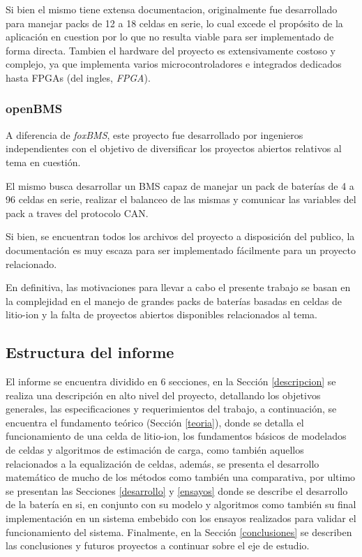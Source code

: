 \documentclass[10pt, a4paper]{article}
\begin{document}
\noindent Si bien el mismo tiene extensa documentacion, originalmente fue
desarrollado para manejar packs de 12 a 18 celdas en serie, lo cual excede el
prop\'osito de la aplicaci\'on en cuestion por lo que no resulta viable para ser
implementado de forma directa. Tambien el hardware del proyecto es
extensivamente costoso y complejo, ya que implementa varios microcontroladores e
integrados dedicados hasta \acrshort{FPGA}s (del ingles, \emph{\acrlong{FPGA}}).

\subsubsection{openBMS}

A diferencia de \emph{foxBMS}, este proyecto fue desarrollado por ingenieros
independientes con el objetivo de diversificar los proyectos abiertos relativos
al tema en cuesti\'on.

\noindent El mismo busca desarrollar un \acrshort{BMS} capaz de manejar un
pack de bater\'ias de 4 a 96 celdas en serie, realizar el balanceo de las mismas 
y comunicar las variables del pack a traves del protocolo \acrshort{CAN}.

\noindent Si bien, se encuentran todos los archivos del proyecto a disposición
del publico, la documentaci\'on es muy escaza para ser implementado
f\'acilmente para un proyecto relacionado.

\noindent En definitiva, las motivaciones para llevar a cabo el presente trabajo
se basan en la complejidad en el manejo de grandes packs de
bater\'ias basadas en celdas de litio-ion y la falta de proyectos abiertos
disponibles relacionados al tema.

\subsection{Estructura del informe}

El informe se encuentra dividido en 6 secciones, en la Sección \ref{descripcion}
se realiza una descripci\'on en alto nivel del proyecto, detallando los
objetivos generales, las especificaciones y requerimientos del trabajo, a
continuaci\'on, se encuentra el fundamento te\'orico (Secci\'on \ref{teoria}),
donde se detalla el funcionamiento de una celda de litio-ion, los fundamentos
b\'asicos de modelados de celdas y algoritmos de estimaci\'on de carga, como
tambi\'en aquellos relacionados a la equalizaci\'on de celdas, adem\'as, se
presenta el desarrollo matem\'atico de mucho de los m\'etodos como tambi\'en una
comparativa, por ultimo se presentan las Secciones \ref{desarrollo} y
\ref{ensayos} donde se describe el desarrollo de la bater\'ia en si, en conjunto
con su modelo y algoritmos como tambi\'en su final implementaci\'on en un
sistema embebido con los ensayos realizados para validar el funcionamiento del
sistema. Finalmente, en la Secci\'on \ref{conclusiones} se describen las
conclusiones y futuros proyectos a continuar sobre el eje de estudio.
\end{document}
